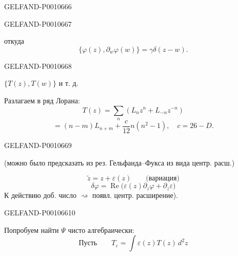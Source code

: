 \begin{GelfandAdjacentEvidence}{GELFAND-P001066}{6}

\end{GelfandAdjacentEvidence}
\begin{GelfandAdjacentEvidence}{GELFAND-P001066}{7}


откуда
\begin{equation*}
\{\varphi(z),\partial_w\varphi(w)\}=\gamma\delta(z-w).
\tag{17}
\end{equation*}
\end{GelfandAdjacentEvidence}
\begin{GelfandAdjacentEvidence}{GELFAND-P001066}{8}

\(\{T(z),T(w)\}\) и т. д.

Разлагаем в ряд Лорана:
\begin{equation*}
T(z)=\sum_n(L_n z^n+L_{-n}z^{-n})
\tag{18}
\end{equation*}
\begin{equation*}
[L_n,L_m]=(n-m)L_{n+m}+\frac{c}{12}n(n^2-1),
\quad c=26-D.
\tag{19}
\end{equation*}
\end{GelfandAdjacentEvidence}
\begin{GelfandAdjacentEvidence}{GELFAND-P001066}{9}

(можно было предсказать из рез. Гельфанда–Фукса из вида центр. расш.)

\[
\widetilde z=z+\varepsilon(z)\qquad\text{(вариация)}
\]
\[
\delta\varphi=\operatorname{Re}
  \bigl(\varepsilon(z)\partial_z\varphi+\partial_z\varepsilon\bigr)
\]
К действию доб. число \(\rightsquigarrow\) появл. центр. расширение).
\end{GelfandAdjacentEvidence}
\begin{GelfandAdjacentEvidence}{GELFAND-P001066}{10}


Попробуем найти \(\Psi\) чисто алгебраически:
\begin{equation*}
\text{Пусть}\qquad T_\varepsilon=\int\varepsilon(z)T(z)\,d^2z
\tag{20}
\end{equation*}
\end{GelfandAdjacentEvidence}
